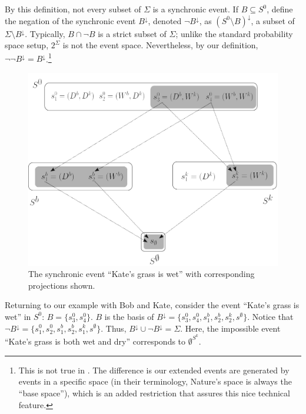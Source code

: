 \documentclass[
11pt,
titlepage,
reqno,
]{article}%
\theoremstyle{definition}
\begin{document}
By this definition, not every subset of $\Sigma$ is a synchronic event.
If $B\subseteq S^0$, define the negation of the synchronic event $B^{\downarrow}$, denoted $\lnot B^{\downarrow}$, as $(S^0\setminus B)^{\downarrow}$,  a  subset of $\Sigma\setminus B^{\downarrow}$.
Typically, $B\cap \lnot B$ is a strict subset of $\Sigma$; unlike the standard probability space setup, $2^\Sigma$ is not the event space.
Nevertheless, by our definition, $\lnot\lnot B^\downarrow = B^\downarrow$.\footnote
{
	This is not true in \citet{Heifetz2006}.
		The difference is our extended events are generated by events in a specific space (in their terminology, Nature's space is always the ``base space''), which is an added restriction that assures this nice technical feature.
}

\begin{figure}[h!]	
	\begin{center}
		\includegraphics[scale=.4]{lattice-event.png}
	\end{center}
	\caption{The synchronic event ``Kate's grass is wet'' with corresponding projections shown.\label{lattice-event}}
\end{figure}
	
Returning to our example with Bob and Kate, consider the event ``Kate's grass is wet'' in $S^0$: $B=\{s^0_3,s^0_4\}$.
$B$ is the basis of $B^{\downarrow}=\{s^0_3,s^0_4,s^b_1,s^b_2,s^k_2,s^\emptyset\}$.
Notice that $\lnot B^{\downarrow}=\{s^0_1,s^0_2,s^b_1,s^b_2,s^k_1,s^\emptyset\}$.
Thus, $B^{\downarrow}\cup \lnot B^{\downarrow}=\Sigma$.
Here, the impossible event ``Kate's grass is both wet and dry'' corresponds to $\emptyset^{S^k}$.
	 
\end{document}
